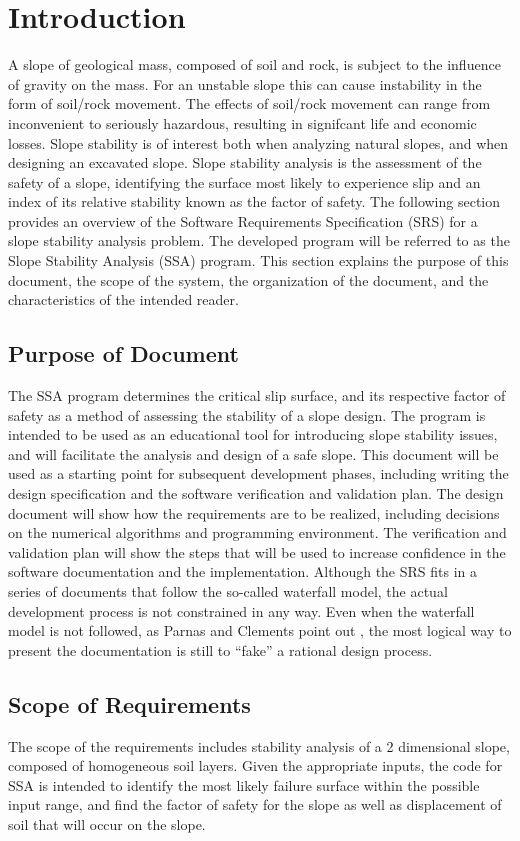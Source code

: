 \documentclass[12pt]{article}
\begin{document}
\section{Introduction}
\label{Sec:Intro}
A slope of geological mass, composed of soil and rock, is subject to the influence of gravity on the mass. For an unstable slope this can cause instability in the form of soil/rock movement. The effects of soil/rock movement can range from inconvenient to seriously hazardous, resulting in signifcant life and economic losses. Slope stability is of interest both when analyzing natural slopes, and when designing an excavated slope. Slope stability analysis is the assessment of the safety of a slope, identifying the surface most likely to experience slip and an index of its relative stability known as the factor of safety.
The following section provides an overview of the Software Requirements Specification (SRS) for a slope stability analysis problem. The developed program will be referred to as the Slope Stability Analysis (SSA) program. This section explains the purpose of this document, the scope of the system, the organization of the document, and the characteristics of the intended reader.
\subsection{Purpose of Document}
\label{Sec:DocPurpose}
The SSA program determines the critical slip surface, and its respective factor of safety as a method of assessing the stability of a slope design. The program is intended to be used as an educational tool for introducing slope stability issues, and will facilitate the analysis and design of a safe slope.
This document will be used as a starting point for subsequent development phases, including writing the design specification and the software verification and validation plan. The design document will show how the requirements are to be realized, including decisions on the numerical algorithms and programming environment. The verification and validation plan will show the steps that will be used to increase confidence in the software documentation and the implementation. Although the SRS fits in a series of documents that follow the so-called waterfall model, the actual development process is not constrained in any way. Even when the waterfall model is not followed, as Parnas and Clements point out \cite{parnasClements1986}, the most logical way to present the documentation is still to ``fake'' a rational design process.
\subsection{Scope of Requirements}
\label{Sec:ReqsScope}
The scope of the requirements includes stability analysis of a 2 dimensional slope, composed of homogeneous soil layers. Given the appropriate inputs, the code for SSA is intended to identify the most likely failure surface within the possible input range, and find the factor of safety for the slope as well as displacement of soil that will occur on the slope.
\end{document}
